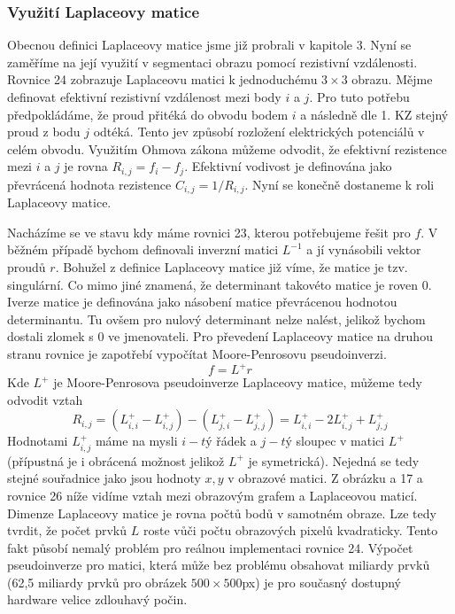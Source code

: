 \documentclass[czech, master, public, dept460, male, cpdeclaration, oneside]{diploma}
\begin{document}
\subsubsection{Využití Laplaceovy matice}
Obecnou definici Laplaceovy matice jsme již probrali v kapitole 3. Nyní se zaměříme na její využití v segmentaci obrazu pomocí rezistivní vzdálenosti. Rovnice 24 zobrazuje Laplaceovu matici k jednoduchému $3 \times 3$ obrazu. Mějme definovat efektivní rezistivní vzdálenost mezi body $i$ a $j$. Pro tuto potřebu předpokládáme, že proud přitéká do obvodu bodem $i$ a následně dle 1. KZ stejný proud z bodu $j$ odtéká. Tento jev způsobí rozložení elektrických potenciálů v celém obvodu. Využitím Ohmova zákona můžeme odvodit, že efektivní rezistence mezi $i$ a $j$ je rovna $R_{i,j} = f_i - f_j$. Efektivní vodivost je definována jako převrácená hodnota rezistence $C_{i,j} = 1 / R_{i,j}$. Nyní se konečně dostaneme k roli Laplaceovy matice. \par
Nacházíme se ve stavu kdy máme rovnici 23, kterou potřebujeme řešit pro $f$. V běžném případě bychom definovali inverzní matici $L^{-1}$ a jí vynásobili vektor proudů $r$. Bohužel z definice Laplaceovy matice již víme, že matice je tzv. singulární. Co mimo jiné znamená, že determinant takovéto matice je roven 0. Iverze matice je definována jako násobení matice převrácenou hodnotou determinantu. Tu ovšem pro nulový determinant nelze nalést, jelikož bychom dostali zlomek s 0 ve jmenovateli. Pro převedení Laplaceovy matice na druhou stranu rovnice je zapotřebí vypočítat Moore-Penrosovu pseudoinverzi.
\begin{equation}
f = L^+ r
\end{equation}
\noindent
Kde $L^+$ je Moore-Penrosova pseudoinverze Laplaceovy matice, můžeme tedy odvodit vztah
\begin{equation}
R_{i,j} = (L^+_{i,i} - L^+_{i,j}) -  (L^+_{j,i} - L^+_{j,j}) = L^+_{i,i} - 2L^+_{i,j} + L^+_{j,j}
\end{equation}
\noindent
Hodnotami $L^+_{i,j}$ máme na mysli $i-tý$ řádek a $j-tý$ sloupec v matici $L^+$ (přípustná je i obrácená možnost jelikož $L^+$ je symetrická). Nejedná se tedy stejné souřadnice jako jsou hodnoty $x, y$ v obrazové matici. Z obrázku a 17 a rovnice 26 níže vidíme vztah mezi obrazovým grafem a Laplaceovou maticí. Dimenze Laplaceovy matice je rovna počtů bodů v samotném obraze. Lze tedy tvrdit, že počet prvků $L$ roste vůči počtu obrazových pixelů kvadraticky. Tento fakt působí nemalý problém pro reálnou implementaci rovnice 24. Výpočet pseudoinverze pro matici, která může bez problému obsahovat miliardy prvků (62,5 miliardy prvků pro obrázek $500\times500$px) je pro současný dostupný hardware velice zdlouhavý počin.
\end{document}
